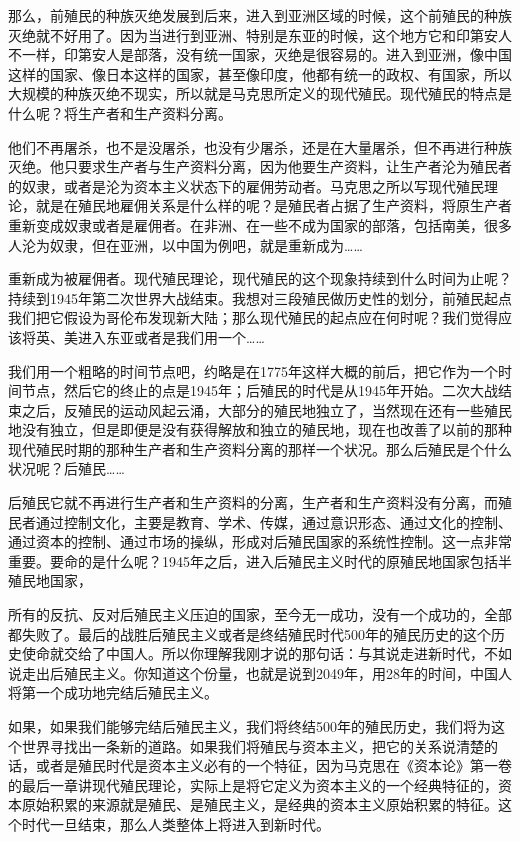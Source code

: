 \documentclass[UTF8, 12pt, a4paper]{ctexrep}
\begin{document}
那么，前殖民的种族灭绝发展到后来，进入到亚洲区域的时候，这个前殖民的种族灭绝就不好用了。因为当进行到亚洲、特别是东亚的时候，这个地方它和印第安人不一样，印第安人是部落，没有统一国家，灭绝是很容易的。进入到亚洲，像中国这样的国家、像日本这样的国家，甚至像印度，他都有统一的政权、有国家，所以大规模的种族灭绝不现实，所以就是马克思所定义的现代殖民。现代殖民的特点是什么呢？将生产者和生产资料分离。

他们不再屠杀，也不是没屠杀，也没有少屠杀，还是在大量屠杀，但不再进行种族灭绝。他只要求生产者与生产资料分离，因为他要生产资料，让生产者沦为殖民者的奴隶，或者是沦为资本主义状态下的雇佣劳动者。马克思之所以写现代殖民理论，就是在殖民地雇佣关系是什么样的呢？是殖民者占据了生产资料，将原生产者重新变成奴隶或者是雇佣者。在非洲、在一些不成为国家的部落，包括南美，很多人沦为奴隶，但在亚洲，以中国为例吧，就是重新成为……

重新成为被雇佣者。现代殖民理论，现代殖民的这个现象持续到什么时间为止呢？持续到1945年第二次世界大战结束。我想对三段殖民做历史性的划分，前殖民起点我们把它假设为哥伦布发现新大陆；那么现代殖民的起点应在何时呢？我们觉得应该将英、美进入东亚或者是我们用一个……

我们用一个粗略的时间节点吧，约略是在1775年这样大概的前后，把它作为一个时间节点，然后它的终止的点是1945年；后殖民的时代是从1945年开始。二次大战结束之后，反殖民的运动风起云涌，大部分的殖民地独立了，当然现在还有一些殖民地没有独立，但是即便是没有获得解放和独立的殖民地，现在也改善了以前的那种现代殖民时期的那种生产者和生产资料分离的那样一个状况。那么后殖民是个什么状况呢？后殖民……

后殖民它就不再进行生产者和生产资料的分离，生产者和生产资料没有分离，而殖民者通过控制文化，主要是教育、学术、传媒，通过意识形态、通过文化的控制、通过资本的控制、通过市场的操纵，形成对后殖民国家的系统性控制。这一点非常重要。要命的是什么呢？1945年之后，进入后殖民主义时代的原殖民地国家包括半殖民地国家，

所有的反抗、反对后殖民主义压迫的国家，至今无一成功，没有一个成功的，全部都失败了。最后的战胜后殖民主义或者是终结殖民时代500年的殖民历史的这个历史使命就交给了中国人。所以你理解我刚才说的那句话：与其说走进新时代，不如说走出后殖民主义。你知道这个份量，也就是说到2049年，用28年的时间，中国人将第一个成功地完结后殖民主义。

如果，如果我们能够完结后殖民主义，我们将终结500年的殖民历史，我们将为这个世界寻找出一条新的道路。如果我们将殖民与资本主义，把它的关系说清楚的话，或者是殖民时代是资本主义必有的一个特征，因为马克思在《资本论》第一卷的最后一章讲现代殖民理论，实际上是将它定义为资本主义的一个经典特征的，资本原始积累的来源就是殖民、是殖民主义，是经典的资本主义原始积累的特征。这个时代一旦结束，那么人类整体上将进入到新时代。
\end{document}
